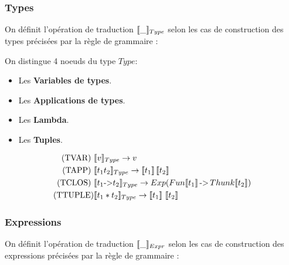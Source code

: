 \documentclass[12pt]{article}
\begin{document}
\subsubsection*{Types}\label{types-2}

On définit l'opération de traduction \(\llbracket \_ \rrbracket_{Type}\) selon les cas de construction
des types précisées par la règle de grammaire : 

On distingue 4 noeuds du type $Type$:
\begin{itemize}
      \tightlist
      \item
            Les \textbf{Variables de types}.
      \item
            Les \textbf{Applications de types}.
      \item
            Les \textbf{Lambda}.
      \item
            Les \textbf{Tuples}.
\end{itemize}
\begin{align*}
      \text{(TVAR) }  & \llbracket v \rrbracket_{Type} \rightarrow  v                                                                                          \\
      \text{(TAPP) }  & \llbracket t_1 t_2 \rrbracket_{Type} \rightarrow  \llbracket t_1 \rrbracket \, \llbracket t_2 \rrbracket                                       \\
      \text{(TCLOS) } & \llbracket t_1 \text{->} t_2 \rrbracket_{Type} \rightarrow  Exp (Fun\llbracket t_1 \rrbracket \, \text{->} \, Thunk\llbracket t_2 \rrbracket ) \\
      \text{(TTUPLE)} & \llbracket t_1 * t_2 \rrbracket_{Type} \rightarrow  \llbracket t_1 \rrbracket \,  \, \llbracket t_2 \rrbracket
\end{align*}

\subsubsection*{Expressions}\label{exprs}

On définit l'opération de traduction \(\llbracket \_ \rrbracket_{Expr}\) selon les cas de construction
des expressions précisées par la règle de grammaire : 
\end{document}
